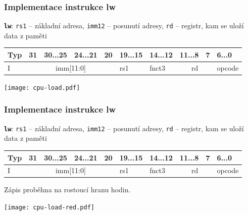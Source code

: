 \documentclass{beamer}
\begin{document}
\begin{frame}[shrink=15]
\frametitle{Implementace instrukce lw}

\textbf{\texttt{lw}}: \texttt{rs1} -- základní adresa, \texttt{imm12} -- posunutí adresy, \texttt{rd} -- registr, kam se uloží data z paměti

\bigskip

\begin{table}
\footnotesize
\begin{tabular}{|m{0.4cm}|m{0.4cm}|m{1.0cm}|m{1.0cm}|m{0.4cm}|m{1.0cm}|m{1.0cm}|m{1.0cm}|m{0.4cm}|m{1.0cm}|}\hline
Typ & 31 & 30...25 & 24...21 & 20 & 19...15 & 14...12 & 11...8 & 7 & 6...0 \\ \hline
I & \multicolumn{4}{c|}{ imm[11:0] } & rs1 & fnct3 &\multicolumn{2}{c|}{ rd } & opcode\\ \hline
\end{tabular}
\end{table}

\bigskip

\begin{center}
\texttt{[image: cpu-load.pdf]}
\end{center}

\end{frame}

\begin{frame}[shrink=15]
\frametitle{Implementace instrukce lw}

\textbf{\texttt{lw}}: \texttt{rs1} -- základní adresa, \texttt{imm12} -- posunutí adresy, \texttt{rd} -- registr, kam se uloží data z paměti

\bigskip

\begin{table}
\footnotesize
\begin{tabular}{|m{0.4cm}|m{0.4cm}|m{1.0cm}|m{1.0cm}|m{0.4cm}|m{1.0cm}|m{1.0cm}|m{1.0cm}|m{0.4cm}|m{1.0cm}|}\hline
Typ & 31 & 30...25 & 24...21 & 20 & 19...15 & 14...12 & 11...8 & 7 & 6...0 \\ \hline
I & \multicolumn{4}{c|}{ imm[11:0] } & rs1 & fnct3 &\multicolumn{2}{c|}{ rd } & opcode\\ \hline
\end{tabular}
\end{table}

Zápis proběhna na rostoucí hranu hodin.

\begin{center}
\texttt{[image: cpu-load-red.pdf]}
\end{center}



\end{frame}
\end{document}
